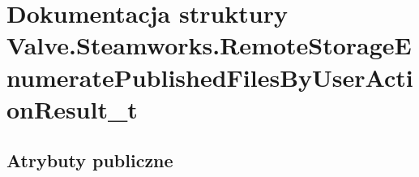 \hypertarget{struct_valve_1_1_steamworks_1_1_remote_storage_enumerate_published_files_by_user_action_result__t}{}\section{Dokumentacja struktury Valve.\+Steamworks.\+Remote\+Storage\+Enumerate\+Published\+Files\+By\+User\+Action\+Result\+\_\+t}
\label{struct_valve_1_1_steamworks_1_1_remote_storage_enumerate_published_files_by_user_action_result__t}
\subsection*{Atrybuty publiczne}
